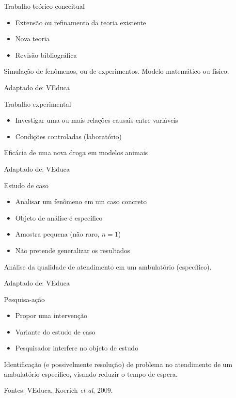 \documentclass{beamer}
\begin{document}
\begin{frame}{Trabalho teórico-conceitual}
  \begin{itemize}
    \footnotesize
  \item Extensão ou refinamento da teoria existente
  \item Nova teoria
  \item Revisão bibliográfica
  \end{itemize}
  \begin{example}
    Simulação de fenômenos, ou de experimentos. Modelo matemático ou físico.
  \end{example}

  \vfill
  \scriptsize
  Adaptado de: VEduca
\end{frame}

\begin{frame}{Trabalho experimental}
  \begin{itemize}
    \footnotesize
  \item Investigar uma ou mais relações causais entre variáveis
  \item Condições controladas (laboratório)
  \end{itemize}
  \begin{example}
    Eficácia de uma nova droga em modelos animais
  \end{example}

  \vfill
  \scriptsize
  Adaptado de: VEduca
\end{frame}

\begin{frame}{Estudo de caso}
  \begin{itemize}
    \footnotesize
  \item Analisar um fenômeno em um caso concreto
  \item Objeto de análise é específico
  \item Amostra pequena (não raro, $n=1$)
  \item Não pretende generalizar os resultados
  \end{itemize}
  \begin{example}
    Análise da qualidade de atendimento em um ambulatório (específico).
  \end{example}

  \vfill
  \scriptsize
  Adaptado de: VEduca
\end{frame}

\begin{frame}{Pesquisa-ação}
  \begin{itemize}
    \footnotesize
  \item Propor uma \alert{intervenção}
  \item Variante do estudo de caso
  \item Pesquisador interfere no objeto de estudo
  \end{itemize}
  \begin{example}
    Identificação (e possivelmente resolução) de problema no
    atendimento de um ambulatório específico, visando reduzir o tempo
    de espera.
  \end{example}

  \vfill
  \scriptsize
  Fontes: VEduca, Koerich {\em et al}, 2009.
\end{frame}
\end{document}
